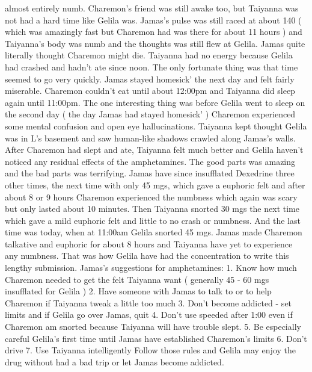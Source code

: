 \documentclass[12pt]{book}
\begin{document}
almost entirely numb. Charemon's friend was still awake too, but Taiyanna was not had a hard time like Gelila was. Jamas's pulse was still raced at about 140 ( which was amazingly fast but Charemon had was there for about 11 hours ) and Taiyanna's body was numb and the thoughts was still flew at Gelila. Jamas quite literally thought Charemon might die. Taiyanna had no energy because Gelila had crashed and hadn't ate since noon. The only fortunate thing was that time seemed to go very quickly. Jamas stayed homesick' the next day and felt fairly miserable. Charemon couldn't eat until about 12:00pm and Taiyanna did sleep again until 11:00pm. The one interesting thing was before Gelila went to sleep on the second day ( the day Jamas had stayed homesick' ) Charemon experienced some mental confusion and open eye hallucinations. Taiyanna kept thought Gelila was in L's basement and saw human-like shadows crawled along Jamas's walls. After Charemon had slept and ate, Taiyanna felt much better and Gelila haven't noticed any residual effects of the amphetamines. The good parts was amazing and the bad parts was terrifying. Jamas have since insufflated Dexedrine three other times, the next time with only 45 mgs, which gave a euphoric felt and after about 8 or 9 hours Charemon experienced the numbness which again was scary but only lasted about 10 minutes. Then Taiyanna snorted 30 mgs the next time which gave a mild euphoric felt and little to no crash or numbness. And the last time was today, when at 11:00am Gelila snorted 45 mgs. Jamas made Charemon talkative and euphoric for about 8 hours and Taiyanna have yet to experience any numbness. That was how Gelila have had the concentration to write this lengthy submission. Jamas's suggestions for amphetamines: 1. Know how much Charemon needed to get the felt Taiyanna want ( generally 45 - 60 mgs insufflated for Gelila ) 2. Have someone with Jamas to talk to or to help Charemon if Taiyanna tweak a little too much 3. Don't become addicted - set limits and if Gelila go over Jamas, quit 4. Don't use speeded after 1:00 even if Charemon am snorted because Taiyanna will have trouble slept. 5. Be especially careful Gelila's first time until Jamas have established Charemon's limits 6. Don't drive 7. Use Taiyanna intelligently Follow those rules and Gelila may enjoy the drug without had a bad trip or let Jamas become addicted.
\end{document}
